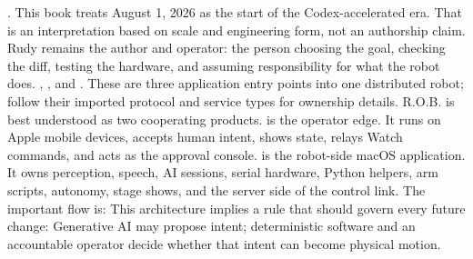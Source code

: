 {}.\markdownRendererParagraphSeparator
{}This book treats August 1, 2026 as the start of the Codex-accelerated era. That\markdownRendererSoftLineBreak
{}is an interpretation based on scale and engineering form, not an authorship\markdownRendererSoftLineBreak
{}claim. Rudy remains the author and operator: the person choosing the goal,\markdownRendererSoftLineBreak
{}checking the diff, testing the hardware, and assuming responsibility for what\markdownRendererSoftLineBreak
{}the robot does.\markdownRendererInterblockSeparator
{}\markdownRendererThematicBreak{}\markdownRendererInterblockSeparator
{}
\markdownRendererSectionEnd \markdownRendererSectionBegin
{}\markdownRendererInterblockSeparator
{}\markdownRendererBlockQuoteBegin
{} , , and . These are three application entry points into one distributed robot; follow their imported protocol and service types for ownership details.\markdownRendererBlockQuoteEnd \markdownRendererInterblockSeparator
{}R.O.B. is best understood as two cooperating products.\markdownRendererParagraphSeparator
{} is the operator edge. It runs on Apple mobile devices, accepts\markdownRendererSoftLineBreak
{}human intent, shows state, relays Watch commands, and acts as the approval\markdownRendererSoftLineBreak
{}console.  is the robot-side macOS application. It owns perception,\markdownRendererSoftLineBreak
{}speech, AI sessions, serial hardware, Python helpers, arm scripts, autonomy,\markdownRendererSoftLineBreak
{}stage shows, and the server side of the control link.\markdownRendererParagraphSeparator
{}The important flow is:\markdownRendererInterblockSeparator
{}\markdownRendererInterblockSeparator
{}This architecture implies a rule that should govern every future change:\markdownRendererInterblockSeparator
{}\markdownRendererBlockQuoteBegin
Generative AI may propose intent; deterministic software and an accountable\markdownRendererSoftLineBreak
{}operator decide whether that intent can become physical motion.\markdownRendererBlockQuoteEnd \markdownRendererInterblockSeparator
